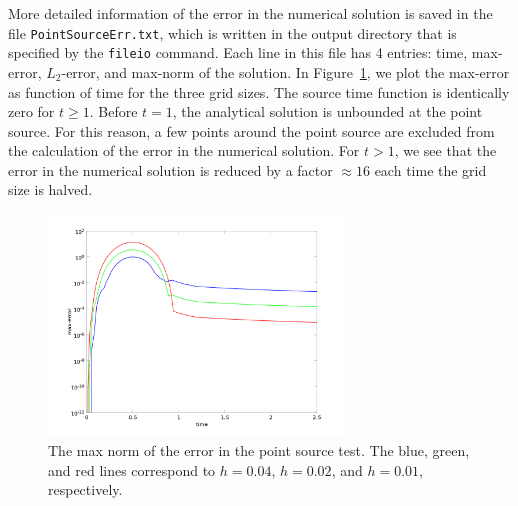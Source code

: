 \documentclass[11pt]{report}
\begin{document}
More detailed information of the error in the numerical solution is saved in the file
\verb+PointSourceErr.txt+, which is written in the output directory that is specified by the
\verb+fileio+ command. Each line in this file has 4 entries: time, max-error, $L_2$-error, and
max-norm of the solution. In Figure~\ref{fig:point-error}, we plot the max-error as function of time
for the three grid sizes. The source time function is identically zero for $t\geq 1$. Before $t=1$,
the analytical solution is unbounded at the point source. For this reason, a few points around the
point source are excluded from the calculation of the error in the numerical solution. For $t>1$, we
see that the error in the numerical solution is reduced by a factor $\approx 16$ each time the grid
size is halved.
\begin{figure}[ht]
\begin{center}
\includegraphics[width=0.7\textwidth]{ps-err.png}
\caption{The max norm of the error in the point source test. The blue, green, and red lines
  correspond to $h=0.04$, $h=0.02$, and $h=0.01$, respectively.}
\label{fig:point-error}
\end{center}
\end{figure}
\end{document}
